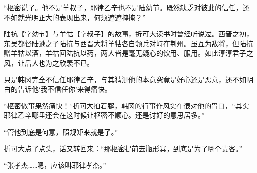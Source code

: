 “枢密说了。他不是羊叔子，耶律乙辛也不是陆幼节。既然缺乏对彼此的信任，还不如就光明正大的表现出来，何须遮遮掩掩？”

陆抗【字幼节】与羊牯【字叔子】的故事，折可大读书时曾经听说过。西晋之初，东吴都督陆逊之子陆抗与西晋大将羊牯各自领兵对峙在荆州。虽互为敌将，但陆抗赠羊牯以酒，羊牯回陆抗以药，两人皆是毫无疑心的饮用、服用。如此淳淳君子之风，让后人也为之欣羡不已。

只是韩冈完全不信任耶律乙辛，与其猜测他的本意究竟是好心还是恶意，还不如明白的告诉他‘我不信任你’来得痛快。

“枢密做事果然痛快！”折可大拍着腿，韩冈的行事作风实在很对他的胃口，“其实耶律乙辛哪里还会在这时候让枢密不顺心。还是讨好的意思居多。”

“管他到底是何意，照规矩来就是了。”

折可大点了点头，话又转回来：“那枢密提前去瓶形寨，到底是为了哪个贵客。”

“张孝杰……嗯，应该叫耶律孝杰。”
